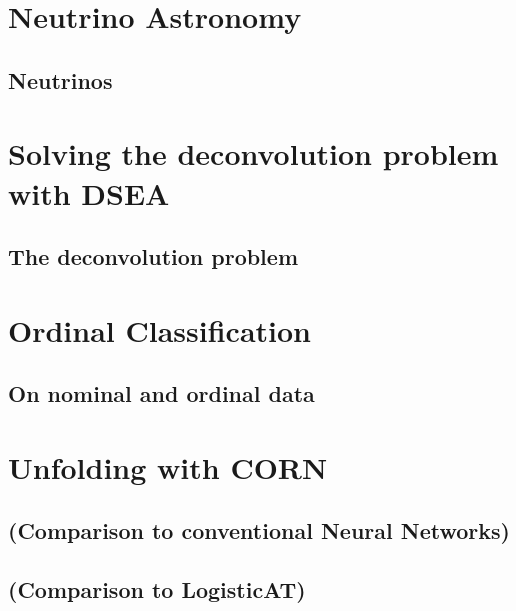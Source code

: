 
\chapter{Neutrino Astronomy}
  \section{Neutrinos}
  \blindtext[8]
  
\chapter{Solving the deconvolution problem with DSEA}
  \section{The deconvolution problem} %
  \blindtext[3]
  
\chapter{Ordinal Classification}
  \section{On nominal and ordinal data}
  \blindtext[3]
  
\chapter{Unfolding with CORN}
  
  
  
  
  
  \section{(Comparison to conventional Neural Networks)}
  \section{(Comparison to LogisticAT)}

